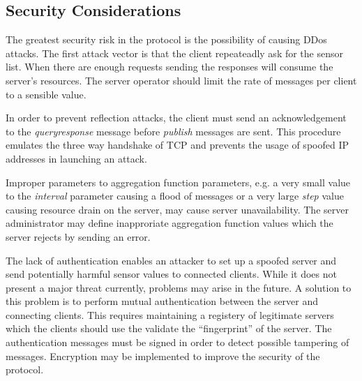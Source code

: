 \documentclass[a4paper]{article}
\begin{document}
\subsection{Security Considerations}
The greatest security risk in the protocol is the possibility of causing DDos
attacks. The first attack vector is that the client repeateadly ask for the 
sensor list. When there are enough requests sending the responses will consume
the server's resources. The server operator should limit the rate of messages per
client to a sensible value. 

In order to prevent reflection attacks, the client must send an acknowledgement
to the \emph{queryresponse} message before \emph{publish} messages are sent.
This procedure emulates the three way handshake of TCP and prevents the usage
of spoofed IP addresses in launching an attack.

Improper parameters to aggregation function parameters, e.g. a very small value
to the \emph{interval} parameter causing a flood of messages or a very large
\emph{step} value causing resource drain on the server, may cause server
unavailability. The server administrator may define inapproriate aggregation 
function values which the server rejects by sending an error.

The lack of authentication enables an attacker to set up a spoofed server and
send potentially harmful sensor values to connected clients. While it does not
present a major threat currently, problems may arise in the future. A solution
to this problem is to perform mutual authentication between the server and 
connecting clients. This requires maintaining a registery of legitimate
servers which the clients should use the validate the ``fingerprint'' of the
server. The authentication messages must be signed in order to detect possible 
tampering of messages. Encryption may be implemented to improve the security of 
the protocol.

\end{document}
